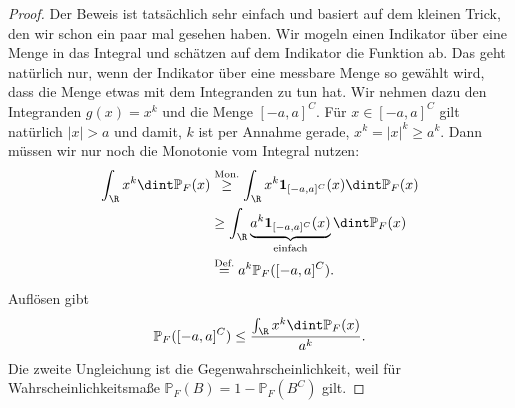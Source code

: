 \begin{proof} 
	Der Beweis ist tats\"achlich sehr einfach und basiert auf dem kleinen Trick, den wir schon ein paar mal gesehen haben. Wir mogeln einen Indikator \"uber eine Menge in das Integral und sch\"atzen auf dem Indikator die Funktion ab. Das geht nat\"urlich nur, wenn der Indikator \"uber eine messbare Menge so gew\"ahlt wird, dass die Menge etwas mit dem Integranden zu tun hat. Wir nehmen dazu den Integranden $g(x)=x^k$ und die Menge $[-a,a]^C$. F\"ur $x\in [-a,a]^C$ gilt nat\"urlich $|x|>a$ und damit, $k$ ist per Annahme gerade, $x^k=|x|^k\geq a^k$. Dann m\"ussen wir nur noch die Monotonie vom Integral nutzen:
	\begin{align*}
		\int_{\R} x^k \dint \mathbb{P}_F(x)& \overset{\text{Mon.}}{\geq} \int_{\R} x^k \mathbf{1}_{[-a,a]^C}(x) \dint \mathbb{P}_F(x)\\
		& \geq \int_{\R} \underbrace{a^k \mathbf{1}_{[-a,a]^C}(x)}_{\text{einfach}} \dint \mathbb{P}_F(x)\\
		& \overset{\text{Def.}}{=} a^k \mathbb{P}_F([-a,a]^C).
	\end{align*}
	Aufl\"osen gibt 
	$$\mathbb{P}_F([-a,a]^C) \leq \frac{\int_{\R} x^k \dint \mathbb{P}_F(x)}{a^k}.$$ Die zweite Ungleichung ist die Gegenwahrscheinlichkeit, weil f\"ur Wahrscheinlichkeitsma\ss e $\mathbb P_F(B)=1-\mathbb P_F(B^C)$ gilt.
\end{proof}

